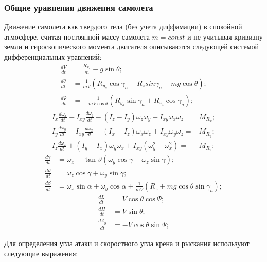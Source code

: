 \documentclass{article}
\begin{document}
\subsubsection{Общие уравнения движения самолета}
Движение самолета как твердого тела (без учета диффамации) в спокойной атмосфере, считая постоянной массу самолета $m=const$ и не учитывая кривизну земли и гироскопического момента двигателя описываются следующей системой дифференциальных уравнений:
\begin{align*}
	\frac{dV}{dt}      & = \frac{R_{x_a}}{m} - g \sin{\theta};                                            \\
	\frac{d\theta}{dt} & = \frac{1}{mV}(R_{y_a} \cos{\gamma_a} - R_{z} sin{\gamma_a} - mg \cos{\theta});  \\
	\frac{d\Psi}{dt}   & = -\frac{1}{mV \cos{\theta}} (R_{y_a} \sin{\gamma_a} + R_{z_a} \cos{\gamma_a});
\end{align*}
\begin{align*}
	I_x \frac{d\omega_x}{dt} - I_{xy} \frac{d\omega_y}{dt} - (I_z - I_y) \omega_z \omega_y + I_{xy} \omega_x \omega_z = & M_{R_x};  \\
	I_y \frac{d\omega_y}{dt} - I_{xy} \frac{d\omega_x}{dt} + (I_x - I_z) \omega_x \omega_z + I_{xy} \omega_y \omega_z = & M_{R_y};  \\
	I_z \frac{d\omega_z}{dt} + (I_y - I_x) \omega_y \omega_x + I_{xy}(\omega_y^2 - \omega_x^2) =                        & M_{R_z};
\end{align*}
\begin{align*}
	\frac{d\gamma}{dt}    & = \omega_x - \tan{\vartheta}(\omega_y \cos{\gamma} - \omega_z \sin{\gamma});                           \\
	\frac{d\vartheta}{dt} & = \omega_z \cos{\gamma} + \omega_y \sin{\gamma};                                                       \\
	\frac{d\beta}{dt}     & = \omega_x \sin{\alpha} + \omega_y \cos{\alpha} + \frac{1}{mV}(R_z + mg \cos{\theta} \sin{\gamma_a});
\end{align*}
\begin{align*}
	\frac{dL}{dt}   & = V\cos{\theta} \cos{\Psi};     \\
	\frac{dH}{dt}   & = V\sin{\theta};                \\ 
	\frac{dZ_g}{dt} & = - V \cos{\theta} \sin{\Psi};
\end{align*}

Для определения угла атаки и скоростного угла крена и рыскания используют следующие выражения:
\end{document}
